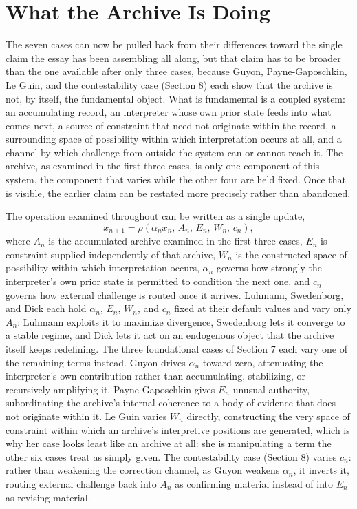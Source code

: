 \documentclass[11pt]{article}
\begin{document}
\section{What the Archive Is Doing}


The seven cases can now be pulled back from their differences toward the single claim the essay has been assembling all along, but that claim has to be broader than the one available after only three cases, because Guyon, Payne-Gaposchkin, Le Guin, and the contestability case (Section 8) each show that the archive is not, by itself, the fundamental object. What is fundamental is a coupled system: an accumulating record, an interpreter whose own prior state feeds into what comes next, a source of constraint that need not originate within the record, a surrounding space of possibility within which interpretation occurs at all, and a channel by which challenge from outside the system can or cannot reach it. The archive, as examined in the first three cases, is only one component of this system, the component that varies while the other four are held fixed. Once that is visible, the earlier claim can be restated more precisely rather than abandoned.

The operation examined throughout can be written as a single update,
\[
x_{n+1} = \rho\!\left(\alpha_n x_n,\, A_n,\, E_n,\, W_n,\, c_n\right),
\]
where $A_n$ is the accumulated archive examined in the first three cases, $E_n$ is constraint supplied independently of that archive, $W_n$ is the constructed space of possibility within which interpretation occurs, $\alpha_n$ governs how strongly the interpreter's own prior state is permitted to condition the next one, and $c_n$ governs how external challenge is routed once it arrives. Luhmann, Swedenborg, and Dick each hold $\alpha_n$, $E_n$, $W_n$, and $c_n$ fixed at their default values and vary only $A_n$: Luhmann exploits it to maximize divergence, Swedenborg lets it converge to a stable regime, and Dick lets it act on an endogenous object that the archive itself keeps redefining. The three foundational cases of Section 7 each vary one of the remaining terms instead. Guyon drives $\alpha_n$ toward zero, attenuating the interpreter's own contribution rather than accumulating, stabilizing, or recursively amplifying it. Payne-Gaposchkin gives $E_n$ unusual authority, subordinating the archive's internal coherence to a body of evidence that does not originate within it. Le Guin varies $W_n$ directly, constructing the very space of constraint within which an archive's interpretive positions are generated, which is why her case looks least like an archive at all: she is manipulating a term the other six cases treat as simply given. The contestability case (Section 8) varies $c_n$: rather than weakening the correction channel, as Guyon weakens $\alpha_n$, it inverts it, routing external challenge back into $A_n$ as confirming material instead of into $E_n$ as revising material.
\end{document}
